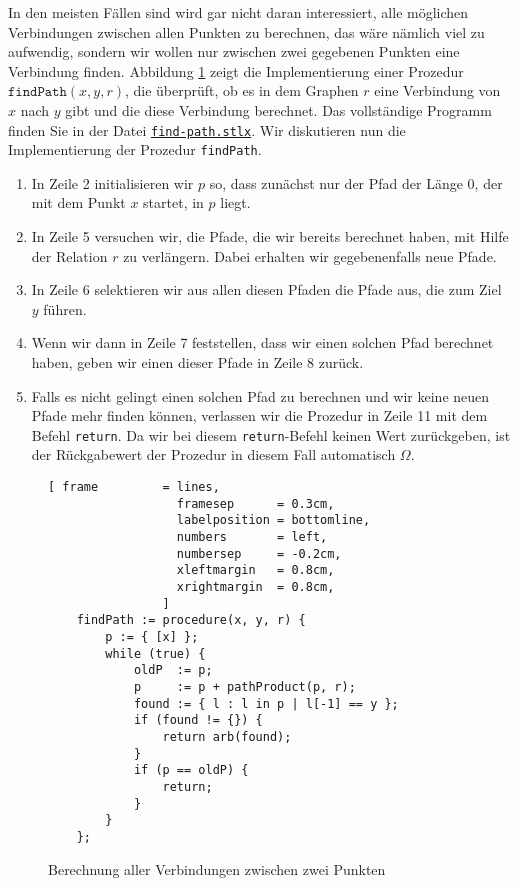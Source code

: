 In den meisten F\"{a}llen sind wird gar nicht daran interessiert, alle m\"{o}glichen Verbindungen
zwischen allen Punkten zu berechnen, das w\"{a}re n\"{a}mlich viel zu aufwendig, sondern wir
wollen nur zwischen zwei gegebenen Punkten 
eine Verbindung finden.  Abbildung \ref{fig:find-path} zeigt die Implementierung einer
Prozedur $\texttt{findPath}(x, y, r)$, die \"{u}berpr\"{u}ft, ob es in dem Graphen $r$ eine
Verbindung von $x$ nach $y$ gibt und die diese Verbindung berechnet.  Das vollst\"{a}ndige
Programm finden Sie in der Datei
\href{https://github.com/karlstroetmann/Logik/blob/master/SetlX/find-path.stlx}{\texttt{find-path.stlx}}.
Wir diskutieren nun die Implementierung der Prozedur \texttt{findPath}.
\begin{enumerate}
\item In Zeile 2 initialisieren wir $p$ so, dass zun\"{a}chst nur der Pfad der L\"{a}nge 0,
      der mit dem Punkt $x$  startet, in $p$ liegt.
\item In Zeile 5 versuchen wir, die Pfade, die wir bereits berechnet haben, mit Hilfe der Relation
      $r$ zu verl\"{a}ngern.  Dabei erhalten wir gegebenenfalls neue Pfade.
\item In Zeile 6 selektieren wir aus allen diesen Pfaden die Pfade aus, die zum Ziel $y$ f\"{u}hren.
\item Wenn wir dann in Zeile 7 feststellen, dass wir einen solchen Pfad berechnet haben,
      geben wir einen dieser Pfade in Zeile 8 zur\"{u}ck.
\item Falls es nicht gelingt einen solchen Pfad zu berechnen und wir keine neuen
      Pfade mehr finden k\"{o}nnen, verlassen wir die Prozedur in Zeile 11
      mit dem Befehl \texttt{return}.  Da wir bei diesem \texttt{return}-Befehl
      keinen Wert zur\"{u}ckgeben, ist der R\"{u}ckgabewert der Prozedur in diesem Fall
      automatisch $\Omega$.
\end{enumerate}

\begin{figure}[!ht]
  \centering
\begin{Verbatim}[ frame         = lines, 
                  framesep      = 0.3cm, 
                  labelposition = bottomline,
                  numbers       = left,
                  numbersep     = -0.2cm,
                  xleftmargin   = 0.8cm,
                  xrightmargin  = 0.8cm,
                ]
    findPath := procedure(x, y, r) {
        p := { [x] };
        while (true) {
            oldP  := p;
            p     := p + pathProduct(p, r);
            found := { l : l in p | l[-1] == y };
            if (found != {}) {
                return arb(found);
            }
            if (p == oldP) {
                return;
            }
        }
    };
\end{Verbatim} 
\vspace*{-0.3cm}
\caption{Berechnung aller Verbindungen zwischen zwei Punkten}  
\label{fig:find-path}
\end{figure}


